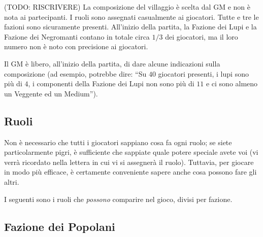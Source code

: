 \documentclass[a4paper,10pt]{article}
\begin{document}
(TODO: RISCRIVERE)
La composizione del villaggio è scelta dal GM e non è nota ai partecipanti. I ruoli sono assegnati casualmente ai giocatori.
Tutte e tre le fazioni sono sicuramente presenti. All'inizio della partita, la Fazione dei Lupi e la Fazione dei Negromanti contano in totale circa $1/3$ dei giocatori, ma il loro numero non è noto con precisione ai giocatori.

Il GM è libero, all'inizio della partita, di dare alcune indicazioni sulla composizione (ad esempio, potrebbe dire: ``Su $40$ giocatori presenti, i lupi sono più di $4$, i componenti della Fazione dei Lupi non sono più di $11$ e ci sono almeno un Veggente ed un Medium'').


\subsection{Ruoli}

Non è necessario che tutti i giocatori sappiano cosa fa ogni ruolo; se siete particolarmente pigri, è sufficiente che sappiate quale potere speciale avete voi (vi verrà ricordato nella lettera in cui vi si assegnerà il ruolo). Tuttavia, per giocare in modo più efficace, è certamente conveniente sapere anche cosa possono fare gli altri.


I seguenti sono i ruoli che \emph{possono} comparire nel gioco, divisi per fazione.


\subsection*{Fazione dei Popolani}
\end{document}
